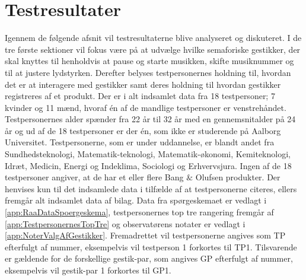 \chapter{Testresultater}
\label{Testresultater}
%
Igennem de følgende afsnit vil testresultaterne blive analyseret og diskuteret. I de tre første sektioner vil fokus være på at udvælge hvilke semaforiske gestikker, der skal knyttes til henholdvis at pause og starte musikken, skifte musiknummer og til at justere lydstyrken. Derefter belyses testpersonernes holdning til, hvordan det er at interagere med gestikker samt deres holdning til hvordan gestikker registreres af et produkt.\blankline
%
Der er i alt indsamlet data fra 18 testpersoner; 7 kvinder og 11 mænd, hvoraf én af de mandlige testpersoner er venstrehåndet. Testpersonernes alder spænder fra 22 år til 32 år med en gennemsnitalder på 24 år og ud af de 18 testpersoner er der én, som ikke er studerende på Aalborg Universitet. Testpersonerne, som er under uddannelse, er blandt andet fra Sundhedsteknologi, Matematik-teknologi, Matematik-økonomi, Kemiteknologi, Idræt, Medicin, Energi og Indeklima, Sociologi og Erhvervsjura. Ingen af de 18 testpersoner angiver, at de har et eller flere Bang $\&$ Olufsen produkter. Der henvises kun til det indsamlede data i tilfælde af at testpersonerne citeres, ellers fremgår alt indsamlet data af bilag. Data fra spørgeskemaet er vedlagt i \autoref{app:RaaDataSpoergeskema}, testpersonernes top tre rangering fremgår af \autoref{app:TestpersonernesTopTre} og observatørens notater er vedlagt i \autoref{app:NoterValgAfGestikker}. Fremadrettet vil testpersonerne angives som TP efterfulgt af nummer, eksempelvis vil testperson 1 forkortes til TP1. Tilsvarende er gældende for de forskellige gestik-par, som angives GP efterfulgt af nummer, eksempelvis vil gestik-par 1 forkortes til GP1.      